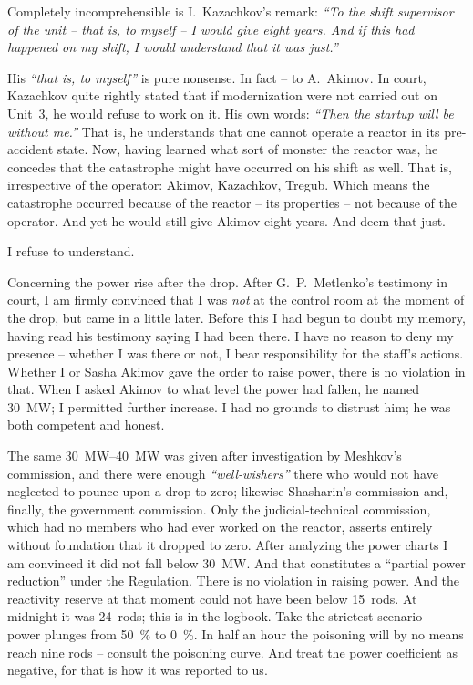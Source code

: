 \documentclass[openright]{bookest}
\begin{document}
Completely incomprehensible is I.~Kazachkov's remark: \textit{``To the shift supervisor of the unit -- that is, to myself -- I would give eight years. And if this had happened on my shift, I would understand that it was just.''}

His \textit{``that is, to myself''} is pure nonsense. In fact -- to A.~Akimov. In court, Kazachkov quite rightly stated that if modernization were not carried out on Unit~3, he would refuse to work on it. His own words: \textit{``Then the startup will be without me.''} That is, he understands that one cannot operate a reactor in its pre-accident state. Now, having learned what sort of monster the reactor was, he concedes that the catastrophe might have occurred on his shift as well. That is, irrespective of the operator: Akimov, Kazachkov, Tregub. Which means the catastrophe occurred because of the reactor -- its properties -- not because of the operator. And yet he would still give Akimov eight years. And deem that just.

I refuse to understand.

Concerning the power rise after the drop. After G.~P.~Metlenko's testimony in court, I am firmly convinced that I was \textit{not} at the control room at the moment of the drop, but came in a little later. Before this I had begun to doubt my memory, having read his testimony saying I had been there. I have no reason to deny my presence -- whether I was there or not, I bear responsibility for the staff's actions. Whether I or Sasha Akimov gave the order to raise power, there is no violation in that. When I asked Akimov to what level the power had fallen, he named \qty{30}{\mega\watt}; I permitted further increase. I had no grounds to distrust him; he was both competent and honest.

The same \qtyrange{30}{40}{\mega\watt} was given after investigation by Meshkov's commission, and there were enough \textit{``well-wishers''} there who would not have neglected to pounce upon a drop to zero; likewise Shasharin's commission and, finally, the government commission. Only the judicial-technical commission, which had no members who had ever worked on the reactor, asserts entirely without foundation that it dropped to zero. After analyzing the power charts I am convinced it did not fall below \qty{30}{\mega\watt}. And that constitutes a ``partial power reduction'' under the Regulation. There is no violation in raising power. And the reactivity reserve at that moment could not have been below \num{15}~rods. At midnight it was \num{24}~rods; this is in the logbook. Take the strictest scenario -- power plunges from \qty{50}{\percent} to \qty{0}{\percent}. In half an hour the poisoning will by no means reach nine rods -- consult the poisoning curve. And treat the power coefficient as negative, for that is how it was reported to us.
\end{document}
